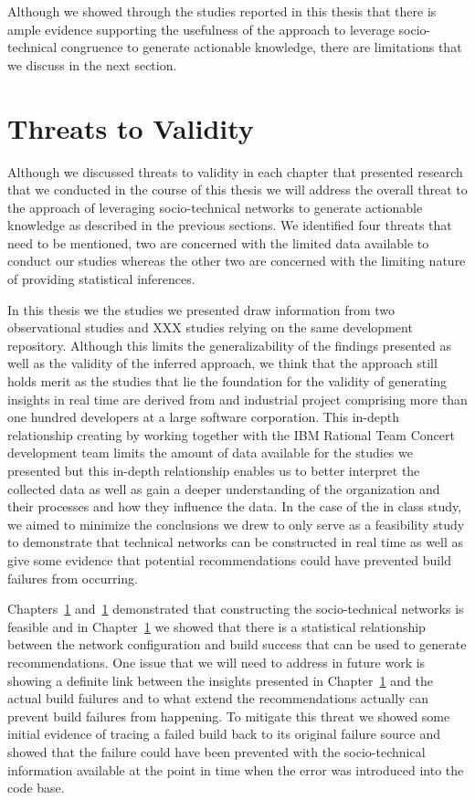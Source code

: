 Although we showed through the studies reported in this thesis that there is ample evidence supporting the usefulness of the approach to leverage socio-technical congruence to generate actionable knowledge, there are limitations that we discuss in the next section.

\section{Threats to Validity}
Although we discussed threats to validity in each chapter that presented research that we conducted in the course of this thesis we will address the overall threat to the approach of leveraging socio-technical networks to generate actionable knowledge as described in the previous sections.
We identified four threats that need to be mentioned, two are concerned with the limited data available to conduct our studies whereas the other two are concerned with the limiting nature of providing statistical inferences.

In this thesis we the studies we presented draw information from two observational studies and XXX studies relying on the same development repository.
Although this limits the generalizability of the findings presented as well as the validity of the inferred approach, we think that the approach still holds merit as the studies that lie the foundation for the validity of generating insights in real time are derived from and industrial project comprising more than one hundred developers at a large software corporation.
This in-depth relationship creating by working together with the IBM Rational Team Concert development team limits the amount of data available for the studies we presented but this in-depth relationship enables us to better interpret the collected data as well as gain a deeper understanding of the organization and their processes and how they influence the data.
In the case of the in class study, we aimed to minimize the conclusions we drew to only serve as a feasibility study to demonstrate that technical networks can be constructed in real time as well as give some evidence that potential recommendations could have prevented build failures from occurring.

Chapters~\ref{} and~\ref{} demonstrated that constructing the socio-technical networks is feasible and in Chapter~\ref{} we showed that there is a statistical relationship between the network configuration and build success that can be used to generate recommendations.
One issue that we will need to address in future work is showing a definite link between the insights presented in Chapter~\ref{} and the actual build failures and to what extend the recommendations actually can prevent build failures from happening.
To mitigate this threat we showed some initial evidence of tracing a failed build back to its original failure source and showed that the failure could have been prevented with the socio-technical information available at the point in time when the error was introduced into the code base.

